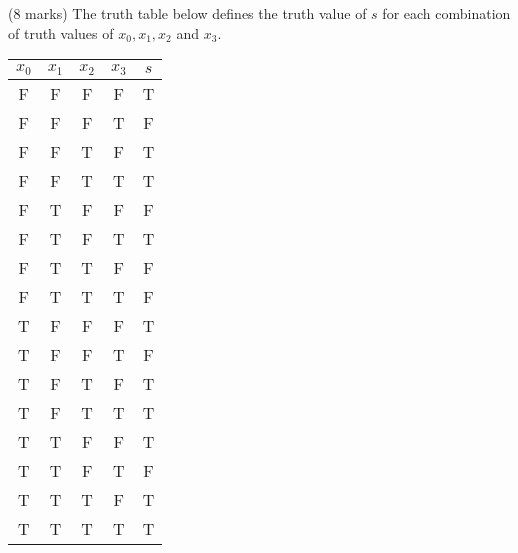 \item (8 marks) The truth table below defines the truth value of $s$ for each combination of truth values of $x_0,x_1,x_2$ and $x_3$.

\begin{tabular}{|c|c|c|c||c|}
\hline
$x_0$ & $x_1$ & $x_2$ & $x_3$ & $s$\\
\hline
\hline
F & F & F & F & T\\
\hline
F & F & F & T & F\\
\hline
F & F & T & F & T\\
\hline
F & F & T & T & T\\
\hline
F & T & F & F & F\\
\hline
F & T & F & T & T\\
\hline
F & T & T & F & F\\
\hline
F & T & T & T & F\\
\hline
T & F & F & F & T\\
\hline
T & F & F & T & F\\
\hline
T & F & T & F & T\\
\hline
T & F & T & T & T\\
\hline
T & T & F & F & T\\
\hline
T & T & F & T & F\\
\hline
T & T & T & F & T\\
\hline
T & T & T & T & T\\
\hline
\end{tabular}

